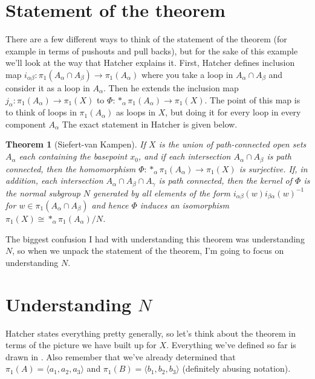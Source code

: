 \documentclass[11pt]{amsart}
\newtheorem*{theorem}{Theorem}
\begin{document}
\section{Statement of the theorem}

There are a few different ways to think of the statement of the theorem (for example in terms of pushouts and pull backs), but for the sake of this example we'll look at the way that Hatcher explains it. 
First, Hatcher defines inclusion map $i_{\alpha \beta}: \pi_1(A_\alpha \cap A_\beta) \rightarrow \pi_1(A_\alpha)$ where you take a loop in $A_\alpha \cap A_\beta$ and consider it as a loop in $A_\alpha$. Then he extends the inclusion map $j_\alpha: \pi_1(A_\alpha) \rightarrow \pi_1(X)$ to $\Phi: *_\alpha \pi_1(A_\alpha) \rightarrow \pi_1(X)$. The point of this map is to think of loops in $\pi_1(A_\alpha)$ as loops in $X$, but doing it for every loop in every component $A_\alpha$
The exact statement in Hatcher is given below.

\begin{theorem}[Siefert-van Kampen]
If $X$ is the union of path-connected open sets $A_\alpha$ each containing the basepoint $x_0$, and if each intersection $A_\alpha \cap A_\beta$ is path connected, then the homomorphism ${\Phi : *_\alpha \pi_1(A_\alpha) \rightarrow \pi_1(X)}$ is surjective. If, in addition, each intersection $A_\alpha \cap A_\beta \cap A_\gamma$ is path connected, then the kernel of $\Phi$ is the normal subgroup $N$ generated by all elements of the form $i_{\alpha\beta} (w) i_{\beta\alpha}(w)^{-1}$ for $w \in \pi_1(A_\alpha \cap A_\beta)$ and hence $\Phi$ induces an isomorphism $\pi_1(X) \cong *_\alpha \pi_1(A_\alpha) / N$.
\end{theorem}

The biggest confusion I had with understanding this theorem was understanding $N$, so when we unpack the statement of the theorem, I'm going to focus on understanding $N$.

\section{Understanding $N$}

Hatcher states everything pretty generally, so let's think about the theorem in terms of the picture we have built up for $X$. Everything we've defined so far is drawn in . Also remember that we've already determined that $\pi_1(A) = \langle a_1, a_2, a_3 \rangle$ and $\pi_1(B) = \langle b_1, b_2, b_3 \rangle$ (definitely abusing notation). 
\end{document}
